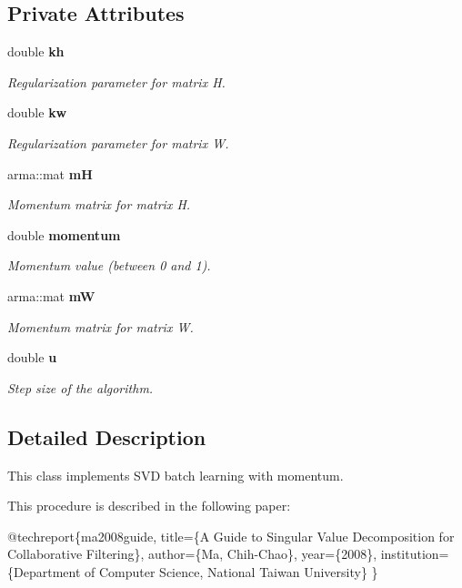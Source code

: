\subsection*{Private Attributes}
\begin{DoxyCompactItemize}
\item 
double {\bf kh}
\begin{DoxyCompactList}\small\item\em Regularization parameter for matrix H. \end{DoxyCompactList}\item 
double {\bf kw}
\begin{DoxyCompactList}\small\item\em Regularization parameter for matrix W. \end{DoxyCompactList}\item 
arma\+::mat {\bf mH}
\begin{DoxyCompactList}\small\item\em Momentum matrix for matrix H. \end{DoxyCompactList}\item 
double {\bf momentum}
\begin{DoxyCompactList}\small\item\em Momentum value (between 0 and 1). \end{DoxyCompactList}\item 
arma\+::mat {\bf mW}
\begin{DoxyCompactList}\small\item\em Momentum matrix for matrix W. \end{DoxyCompactList}\item 
double {\bf u}
\begin{DoxyCompactList}\small\item\em Step size of the algorithm. \end{DoxyCompactList}\end{DoxyCompactItemize}


\subsection{Detailed Description}
This class implements S\+VD batch learning with momentum. 

This procedure is described in the following paper\+:


\begin{DoxyCode}
@techreport\{ma2008guide,
  title=\{A Guide to Singular Value Decomposition \textcolor{keywordflow}{for} Collaborative
      Filtering\},
  author=\{Ma, Chih-Chao\},
  year=\{2008\},
  institution=\{Department of Computer Science, National Taiwan University\}
\}
\end{DoxyCode}


